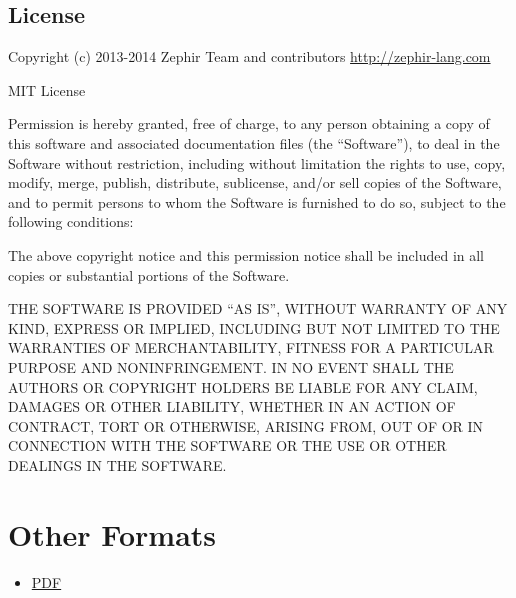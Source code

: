 \documentclass[letterpaper,10pt,english]{sphinxmanual}
\begin{document}
\section{License}
\label{license::doc}\label{license:license}
Copyright (c) 2013-2014 Zephir Team and contributors
\href{http://zephir-lang.com}{http://zephir-lang.com}

MIT License

Permission is hereby granted, free of charge, to any person obtaining a copy
of this software and associated documentation files (the ``Software''), to deal
in the Software without restriction, including without limitation the rights
to use, copy, modify, merge, publish, distribute, sublicense, and/or sell
copies of the Software, and to permit persons to whom the Software is
furnished to do so, subject to the following conditions:

The above copyright notice and this permission notice shall be included in
all copies or substantial portions of the Software.

THE SOFTWARE IS PROVIDED ``AS IS'', WITHOUT WARRANTY OF ANY KIND, EXPRESS OR
IMPLIED, INCLUDING BUT NOT LIMITED TO THE WARRANTIES OF MERCHANTABILITY,
FITNESS FOR A PARTICULAR PURPOSE AND NONINFRINGEMENT. IN NO EVENT SHALL THE
AUTHORS OR COPYRIGHT HOLDERS BE LIABLE FOR ANY CLAIM, DAMAGES OR OTHER
LIABILITY, WHETHER IN AN ACTION OF CONTRACT, TORT OR OTHERWISE, ARISING FROM,
OUT OF OR IN CONNECTION WITH THE SOFTWARE OR THE USE OR OTHER DEALINGS IN
THE SOFTWARE.


\chapter{Other Formats}
\label{index:other-formats}\begin{itemize}
\item {} 
\href{https://github.com/phalcon/zephir-docs/blob/master/en/\_build/latex/ZephirDocumentation.pdf?raw=true}{PDF}

\end{itemize}



\renewcommand{\indexname}{Index}
\printindex
\end{document}
